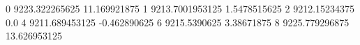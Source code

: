 0 9223.322265625 11.169921875
1 9213.7001953125 1.5478515625
2 9212.15234375 0.0
4 9211.689453125 -0.462890625
6 9215.5390625 3.38671875
8 9225.779296875 13.626953125
